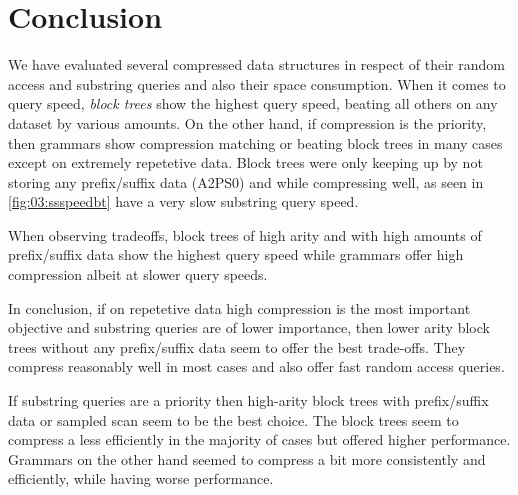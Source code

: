 \documentclass{scrartcl}
\begin{document}
\section{Conclusion}

We have evaluated several compressed data structures in respect of their random access and substring queries and also their space consumption.
When it comes to query speed, \emph{block trees} show the highest query speed, beating all others on any dataset by various amounts.
On the other hand, if compression is the priority, then grammars show compression matching or beating block trees in many cases except on extremely repetetive data.
Block trees were only keeping up by not storing any prefix/suffix data (A2PS0) and while compressing well, as seen in \cref{fig:03:ssspeedbt} have a very slow substring query speed.

When observing tradeoffs, block trees of high arity and with high amounts of prefix/suffix data show the highest query speed while grammars offer high compression albeit at slower query speeds.

In conclusion, if on repetetive data high compression is the most important objective and substring queries are of lower importance,
then lower arity block trees without any prefix/suffix data seem to offer the best trade-offs.
They compress reasonably well in most cases and also offer fast random access queries.

If substring queries are a priority then high-arity block trees with prefix/suffix data or sampled scan seem to be the best choice.
The block trees seem to compress a less efficiently in the majority of cases but offered higher performance.
Grammars on the other hand seemed to compress a bit more consistently and efficiently, while having worse performance.


\end{document}
